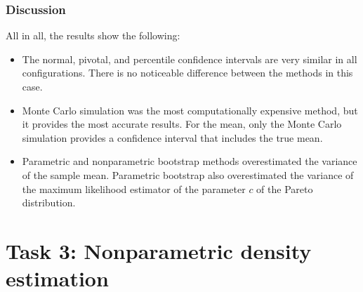 \documentclass{article}
\begin{document}
\subsubsection{Discussion}

All in all, the results show the following:

\begin{itemize}
    \item The normal, pivotal, and percentile confidence intervals are very similar in all configurations. There is no noticeable difference between the methods in this case.
    \item Monte Carlo simulation was the most computationally expensive method, but it provides the most accurate results. For the mean, only the Monte Carlo simulation provides a confidence interval that includes the true mean.
    \item Parametric and nonparametric bootstrap methods overestimated the variance of the sample mean. Parametric bootstrap also overestimated the variance of the maximum likelihood estimator of the parameter \(c\) of the Pareto distribution.
\end{itemize}

\section{Task 3: Nonparametric density estimation}

\end{document}

